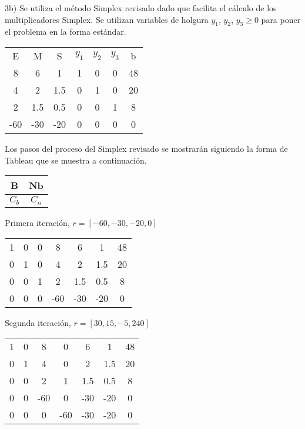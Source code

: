 \documentclass[10pt]{article}
\begin{document}
3b) Se utiliza el m\'etodo Simplex revisado dado que facilita el c\'alculo de los multiplicadores Simplex. Se utilizan variables de holgura $y_1$, $y_2$, $y_3 \geq0$ para poner el problema en la forma est\'andar.


\begin{center}
\begin{tabular}{c c c c c c |c}
E  & M   & S   & $y_1$&	$y_2$&$y_3$&b\\	
8  & 6   & 1   & 1 & 0 & 0 & 48 \\
4  & 2   & 1.5 & 0 & 1 & 0 & 20 \\
2  & 1.5 & 0.5 & 0 & 0 & 1 & 8 \\
\hline
-60 & -30  & -20  & 0 & 0 & 0 & 0 \\
\end{tabular}
\end{center}

Los pasos del proceso del Simplex revisado se mostrar\'an siguiendo la forma de Tableau que se muestra a continuaci\'on.

\begin{center}
\begin{tabular}{c|c}
B & Nb\\	
\hline
$C_b$ & $C_n$\\
\end{tabular}
\end{center}

Primera iteraci\'on, $r=[-60,-30,-20,0]$

\begin{center}
\begin{tabular}{c c c | c c c c}
1	&0	&0&			8	&6	&1	&48\\
0	&1	&0	&		4	&2	&1.5&	20\\
0	&0	&1	&		2	&1.5&	0.5&	8\\
\hline							
								
0	&0&	0&			-60	&-30&	-20&	0\\
\end{tabular}
\end{center}

Segunda iteraci\'on, $r=[30, 15, -5, 240]$

\begin{center}
\begin{tabular}{c c c | c c c c}
1	&0	&8&			0	&6&	1	&48\\
0	&1	&4	&		0	&2	&1.5&	20\\
0	&0&	2	&		1	&1.5&	0.5&	8\\
								
								
0&	0&	-60		&	0&	-30&	-20	&0\\
\hline							
								
0	&0&	0&			-60	&-30&	-20&	0\\
\end{tabular}
\end{center}
\end{document}
